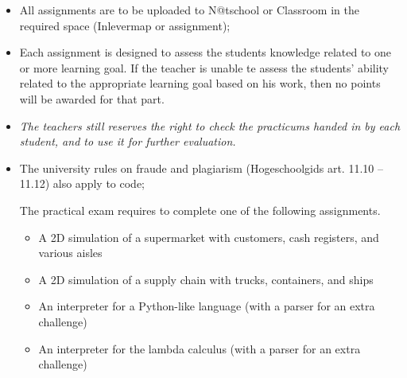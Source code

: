 \begin{itemize}
  \item All assignments are to be uploaded to N@tschool or Classroom in the required space (Inlevermap or assignment);
  \item Each assignment is designed to assess the students knowledge related to one or more learning goal.
          If the teacher is unable te assess the students' ability related to the appropriate learning goal based on his work, then no points will be awarded for that part.
  \item \textit{The teachers still reserves the right to check the practicums handed in by each student, and to use it for further evaluation.}
  \item The university rules on fraude and plagiarism (Hogeschoolgids art. 11.10 -- 11.12) also apply to code;
  
The practical exam requires to complete one of the following assignments.

\begin{itemize}
	\item A 2D simulation of a supermarket with customers, cash registers, and various aisles
	\item A 2D simulation of a supply chain with trucks, containers, and ships
	\item An interpreter for a Python-like language (with a parser for an extra challenge)
	\item An interpreter for the lambda calculus  (with a parser for an extra challenge)
	
\end{itemize}

\end{itemize}
